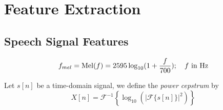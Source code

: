 \chapter{Feature Extraction}
\label{chapter:feature}

\section{Speech Signal Features}
\label{setion:feature-1}

\begin{equation}
\label{eq:mel-function}
f_{mel} = \operatorname{Mel}(f) = 2595 \log_{10} (1 + \frac{f}{700}); \quad f \text{ in Hz}
\end{equation}

Let $s[n]$ be a time-domain signal, we define the \textit{power cepstrum} by
\begin{equation}
\label{eq:time-domain-to-cepstrum}
X[n] = \mathcal{F}^{-1} \left\{\log_{10} \left( |\mathcal{F}\{s[n]\}|^2 \right) \right\}
\end{equation}
